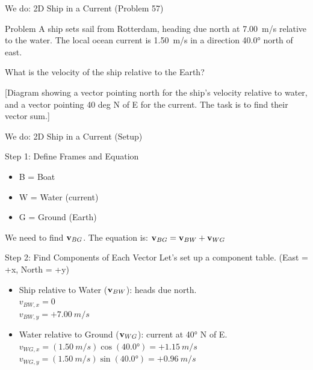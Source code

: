\documentclass{beamer}
\begin{document}
\begin{frame}{We do: 2D Ship in a Current (Problem 57)}
    \begin{block}{Problem}
        A ship sets sail from Rotterdam, heading due north at \SI{7.00}{m/s} relative to the water. The local ocean current is \SI{1.50}{m/s} in a direction \ang{40.0} north of east.
        
        What is the velocity of the ship relative to the Earth?
    \end{block}
    
    \begin{center}
    \alert{[Diagram showing a vector pointing north for the ship's velocity relative to water, and a vector pointing 40 deg N of E for the current. The task is to find their vector sum.]}
    \end{center}
\end{frame}

\begin{frame}{We do: 2D Ship in a Current (Setup)}
    \begin{block}{Step 1: Define Frames and Equation}
        \begin{itemize}
            \item B = Boat
            \item W = Water (current)
            \item G = Ground (Earth)
        \end{itemize}
        We need to find $\vb{v}_{BG}$. The equation is: $\vb{v}_{BG} = \vb{v}_{BW} + \vb{v}_{WG}$
    \end{block}
    
    \begin{block}{Step 2: Find Components of Each Vector}
        Let's set up a component table. (East = +x, North = +y)
        \begin{itemize}
            \item Ship relative to Water ($\vb{v}_{BW}$): heads due north. \\
            $v_{BW,x} = 0$ \\
            $v_{BW,y} = +\SI{7.00}{m/s}$
            \item Water relative to Ground ($\vb{v}_{WG}$): current at \ang{40} N of E. \\
            $v_{WG,x} = (\SI{1.50}{m/s})\cos(\ang{40.0}) = +\SI{1.15}{m/s}$ \\
            $v_{WG,y} = (\SI{1.50}{m/s})\sin(\ang{40.0}) = +\SI{0.96}{m/s}$
        \end{itemize}
    \end{block}
    \end{frame}
\end{document}
